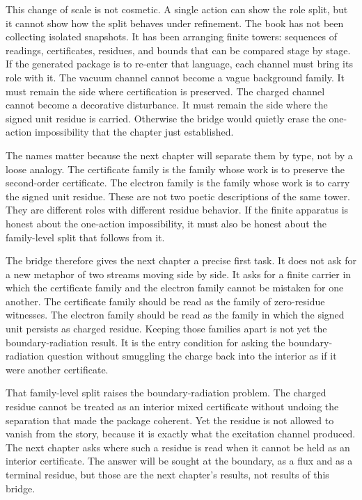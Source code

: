 This change of scale is not cosmetic. A single action can show the role split,
but it cannot show how the split behaves under refinement. The book has not been
collecting isolated snapshots. It has been arranging finite towers: sequences of
readings, certificates, residues, and bounds that can be compared stage by
stage. If the generated package is to re-enter that language, each channel must
bring its role with it. The vacuum channel cannot become a vague background
family. It must remain the side where certification is preserved. The charged
channel cannot become a decorative disturbance. It must remain the side where
the signed unit residue is carried. Otherwise the bridge would quietly erase the
one-action impossibility that the chapter just established.

The names matter because the next chapter will separate them by type, not by a
loose analogy. The certificate family is the family whose work is to preserve
the second-order certificate. The electron family is the family whose work is to
carry the signed unit residue. These are not two poetic descriptions of the
same tower. They are different roles with different residue behavior. If the
finite apparatus is honest about the one-action impossibility, it must also be
honest about the family-level split that follows from it.

The bridge therefore gives the next chapter a precise first task. It does not
ask for a new metaphor of two streams moving side by side. It asks for a finite
carrier in which the certificate family and the electron family cannot be
mistaken for one another. The certificate family should be read as the family of
zero-residue witnesses. The electron family should be read as the family in
which the signed unit persists as charged residue. Keeping those families apart
is not yet the boundary-radiation result. It is the entry condition for asking
the boundary-radiation question without smuggling the charge back into the
interior as if it were another certificate.

That family-level split raises the boundary-radiation problem. The charged
residue cannot be treated as an interior mixed certificate without undoing the
separation that made the package coherent. Yet the residue is not allowed to
vanish from the story, because it is exactly what the excitation channel
produced. The next chapter asks where such a residue is read when it cannot be
held as an interior certificate. The answer will be sought at the boundary, as a
flux and as a terminal residue, but those are the next chapter's results, not
results of this bridge.

